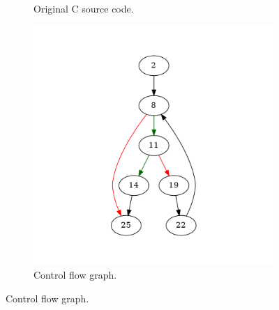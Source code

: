 \begin{figure}[htbp]
	\centering
	\begin{subfigure}[b]{0.48\textwidth}
		\centering
		
		\caption{Original C source code.}
	\end{subfigure}
	\begin{subfigure}[b]{0.50\textwidth}
		\centering
		\includegraphics[width=\textwidth]{inc/appendices/examples/hammock/counter-example/with-break/main.png}
		\caption{Control flow graph.}
	\end{subfigure}
\end{figure}

